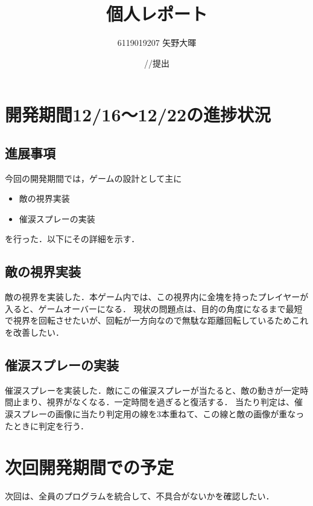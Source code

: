 \documentclass{jarticle}
\title{個人レポート}
\author{6119019207 矢野大暉}
\date{\number\year/\number\month/\number\day 提出}
\newcommand{\xb}{敵の視界実装}
\newcommand{\xc}{催涙スプレーの実装}
\newcommand{\pitem}[2]{
\item #1
\item #2
}
\begin{document}
\maketitle

\section{開発期間12/16～12/22の進捗状況} 

\subsection{進展事項}
今回の開発期間では，ゲームの設計として主に
\begin{itemize}
\pitem{\xb}{\xc}
\end{itemize}
を行った．以下にその詳細を示す．

\subsection{\xb}
敵の視界を実装した．本ゲーム内では、この視界内に金塊を持ったプレイヤーが入ると、ゲームオーバーになる．
現状の問題点は、目的の角度になるまで最短で視界を回転させたいが、回転が一方向なので無駄な距離回転しているためこれを改善したい．

\subsection{\xc}
催涙スプレーを実装した．敵にこの催涙スプレーが当たると、敵の動きが一定時間止まり、視界がなくなる．一定時間を過ぎると復活する．
当たり判定は、催涙スプレーの画像に当たり判定用の線を3本重ねて、この線と敵の画像が重なったときに判定を行う．

\section{次回開発期間での予定}
次回は、全員のプログラムを統合して、不具合がないかを確認したい．
\end{document}
